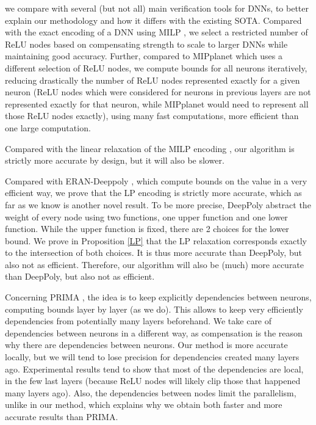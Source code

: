 \smallskip

 we compare with several (but not all) main verification tools for DNNs, to better explain our methodology and how it differs with the existing SOTA. Compared with the exact encoding of a DNN using MILP \cite{MILP}, 
we select a restricted number of ReLU nodes based on compensating strength to scale to larger DNNs while maintaining good accuracy. Further, compared to MIPplanet \cite{MIPplanet} which 
uses a different selection of ReLU nodes, we compute bounds for all neurons iteratively, reducing drastically the number of ReLU nodes represented exactly for a given neuron (ReLU nodes which were considered for neurons in previous layers are not represented exactly for that neuron, while MIPplanet would need to represent all those ReLU nodes exactly), using many fast computations, more efficient than one large computation.

Compared with the linear relaxation of the MILP encoding \cite{MILP}, our algorithm is strictly more accurate by design, but it will also be slower.

Compared with ERAN-Deeppoly \cite{deeppoly}, which compute bounds on the value in a very efficient way, we prove that the LP encoding is strictly more accurate, which as far as we know is another novel result. To be more precise, DeepPoly
abstract the weight of every node using two functions, one upper function and one lower function. While the upper function is fixed, there are 2 choices for the lower bound.
We prove in Proposition  \ref{LP} that the LP relaxation corresponds exactly to the intersection of both choices. It is thus more accurate than DeepPoly, but also not as efficient. Therefore, our algorithm will also be (much) more accurate than DeepPoly, but also not as efficient.

Concerning PRIMA \cite{prima}, the idea is to keep explicitly dependencies between neurons, computing bounds layer by layer (as we do). This allows to keep very efficiently dependencies from potentially many layers beforehand. We take care of dependencies between neurons in a different way, as compensation is the reason why there are dependencies between neurons. 
Our method is more accurate locally, but we will tend to lose precision for dependencies created many layers ago. Experimental results tend to show that most of the dependencies are local, in the few last layers (because ReLU nodes will likely clip those that happened many layers ago). Also, the dependencies between nodes limit the parallelism, unlike in our method, which explains why we obtain both faster and more accurate results than PRIMA.

